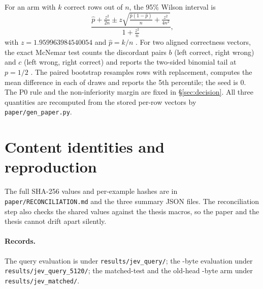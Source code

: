 \documentclass[11pt]{article}
\begin{document}
For an arm with $k$ correct rows out of $n$, the 95\% Wilson interval is
\begin{equation}
\frac{\hat p+\frac{z^2}{2n}\pm z\sqrt{\frac{\hat p(1-\hat p)}{n}+\frac{z^2}{4n^2}}}{1+\frac{z^2}{n}},
\end{equation}
with $z=1.959963984540054$ and $\hat p=k/n$ \citep{wilson1927}. For two aligned
correctness vectors, the exact McNemar test counts the discordant pairs
$b$ (left correct, right wrong) and $c$ (left wrong, right correct) and reports
the two-sided binomial tail at $p=1/2$ \citep{mcnemar1947}. The paired bootstrap
resamples rows with replacement, computes the mean difference in each of
\PBOOT{} draws and reports the 5th percentile; the seed is 0. The P0 rule and
the non-inferiority margin are fixed in \S\ref{sec:decision}. All three quantities are
recomputed from the stored per-row vectors by \texttt{paper/gen\_paper.py}.

\section{Content identities and reproduction}



The full SHA-256 values and per-example hashes are in
\texttt{paper/RECONCILIATION.md} and the three summary JSON files. The
reconciliation step also checks the shared values against the thesis macros, so
the paper and the thesis cannot drift apart silently.

\paragraph{Records.}
The query evaluation is under \texttt{results/jev\_query/}; the \PSeq-byte
evaluation under \texttt{results/jev\_query\_5120/}; the matched-test and the
old-head \PSeq-byte arm under \texttt{results/jev\_matched/}. 
\end{document}
